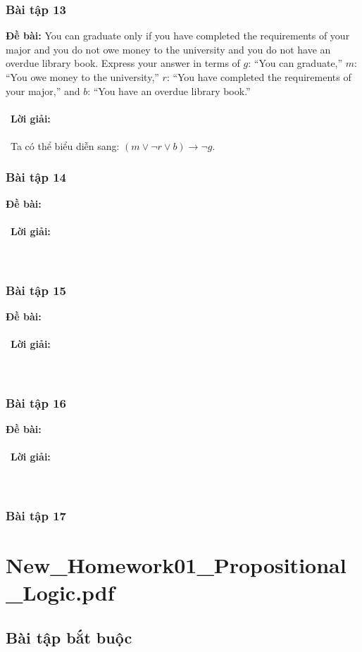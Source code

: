 \documentclass[a4paper]{article}
\begin{document}
\subsubsection{Bài tập 13}
\textbf{Đề bài:} You can graduate only if you have completed the requirements of your major and you do not owe money to the university and you do not have an overdue library book. Express your answer in terms of
$g$: “You can graduate,” $m$: “You owe money to the university,” $r$: “You have completed the requirements
of your major,” and $b$: “You have an overdue library book.” \\\ \\\
\textbf{Lời giải:} \\\ \\\
Ta có thể biểu diễn sang: $(m \lor \lnot r \lor b) \rightarrow \lnot g$.
\clearpage
\subsubsection{Bài tập 14}
\textbf{Đề bài:} 
\\\ \\\
\textbf{Lời giải:} \\\ \\\
\clearpage
\subsubsection{Bài tập 15}
\textbf{Đề bài:} 
\\\ \\\
\textbf{Lời giải:} \\\ \\\
\clearpage
\subsubsection{Bài tập 16}
\textbf{Đề bài:} 
\\\ \\\
\textbf{Lời giải:} \\\ \\\
\clearpage
\subsubsection{Bài tập 17}

\clearpage
\clearpage

\section{New\_Homework01\_Propositional\_Logic.pdf}
\subsection{Bài tập bắt buộc}
\end{document}
